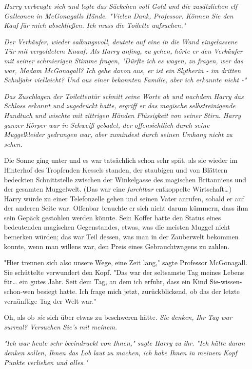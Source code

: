{\emph{Harry verbeugte sich und legte das Säckchen voll Gold und die zusätzlichen elf Galleonen in McGonagalls Hände. "Vielen Dank, Professor. Können Sie den Kauf für mich abschließen. Ich muss die Toilette aufsuchen."}

\emph{Der Verkäufer, wieder salbungsvoll, deutete auf eine in die Wand eingelassene Tür mit vergoldetem Knauf. Als Harry anfing, zu gehen, hörte er den Verkäufer mit seiner schmierigen Stimme fragen, "Dürfte ich es wagen, zu fragen, wer das war, Madam McGonagall? Ich gehe davon aus, er ist ein Slytherin - im dritten Schuljahr vielleicht? Und aus einer bekannten Familie, aber ich erkannte nicht -"}

\emph{Das Zuschlagen der Toilettentür schnitt seine Worte ab und nachdem Harry das Schloss erkannt und zugedrückt hatte, ergriff er das magische selbstreinigende Handtuch und wischte mit zittrigen Händen Flüssigkeit von seiner Stirn. Harry ganzer Körper war in Schweiß gebadet, der} \emph{offensichtlich durch seine Muggelkleider gedrungen war, aber zumindest durch seinen Umhang nicht zu sehen.}

Die Sonne ging unter und es war tatsächlich schon sehr spät, als sie wieder im Hinterhof des Tropfenden Kessels standen, der staubigen und von Blättern bedeckten Schnittstelle zwischen der Winkelgasse des magischen Britanniens und der gesamten Muggelwelt. (Das war eine \emph{furchtbar} entkoppelte Wirtschaft…) Harry würde zu einer Telefonzelle gehen und seinen Vater anrufen, sobald er auf der anderen Seite war. Offenbar brauchte er sich nicht darum kümmern, dass ihm sein Gepäck gestohlen werden könnte. Sein Koffer hatte den Status eines bedeutenden magischen Gegenstandes, etwas, was die meisten Muggel nicht bemerken würden; das war Teil dessen, was man in der Zauberwelt bekommen konnte, wenn man willens war, den Preis eines Gebrauchtwagens zu zahlen.

"Hier trennen sich also unsere Wege, eine Zeit lang," sagte Professor McGonagall. Sie schüttelte verwundert den Kopf. "Das war der seltsamste Tag meines Lebens für… ein gutes Jahr. Seit dem Tag, an dem ich erfuhr, dass ein Kind Sie-wissen-schon-wen besiegt hatte. Ich frage mich jetzt, zurückblickend, ob das der letzte vernünftige Tag der Welt war."

Oh, als ob \emph{sie} sich über etwas zu beschweren hätte. \emph{Sie denken, Ihr Tag war surreal? Versuchen Sie's mit meinem.}

\emph{"Ich war heute sehr beeindruckt von Ihnen," sagte Harry zu ihr. "Ich hätte daran denken sollen, Ihnen das Lob laut zu machen, ich habe Ihnen in meinem Kopf Punkte verliehen und alles."}

}
